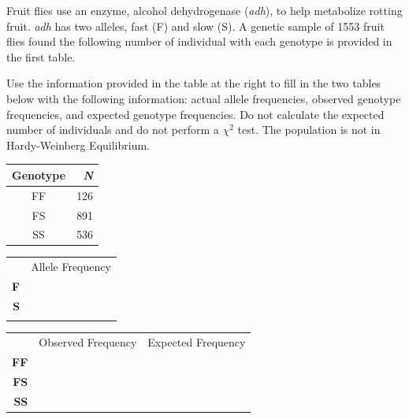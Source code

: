 
\question[15]
Fruit flies use an enzyme, alcohol dehydrogenase (\emph{adh}), to help metabolize rotting fruit. \emph{adh} has two alleles, fast (F) and slow (S).  A genetic sample of 1553 fruit flies found the following number of individual with each genotype is provided in the first table.

\vspace{\baselineskip}

\begin{minipage}{0.6\linewidth}
Use the information provided in the table at the right to fill in the two tables below with the following information: actual allele frequencies, observed genotype frequencies, and expected genotype frequencies.  Do not calculate the expected number of individuals and do not perform a $\chi^2$ test. The population is not in Hardy-Weinberg Equilibrium.
\end{minipage}\hfill
\begin{minipage}{0.3\linewidth}
	\begin{tabular}{cr}
	\toprule
	Genotype	&	\emph{N}\\
	\midrule
	FF	&	126\\
	FS	&	891\\
	SS	&	536\\
	\bottomrule
	\end{tabular}\vfill
\end{minipage}

\vspace{\baselineskip}

\begin{minipage}{0.3\linewidth}
	\begin{tabular}{rc}
	&	Allele Frequency\\[3ex]
	\Large\textbf{F} & \makebox[3cm]{\hrulefill}\\[3ex]
	\Large\textbf{S} & \makebox[3cm]{\hrulefill}\\[3ex]
	\Large\null	 & \null\\
	\end{tabular}
\end{minipage}\hfill
\begin{minipage}{0.6\linewidth}
	\begin{tabular}{rcc}
		&	Observed Frequency		&	Expected Frequency\\[3ex]
		\large\textbf{FF} & \makebox[3cm]{\hrulefill} & \makebox[3cm]{\hrulefill} \\[3ex]
		\large\textbf{FS} & \makebox[3cm]{\hrulefill} & \makebox[3cm]{\hrulefill} \\[3ex]
		\large\textbf{SS} & \makebox[3cm]{\hrulefill} & \makebox[3cm]{\hrulefill} \\
	\end{tabular}
\end{minipage}


